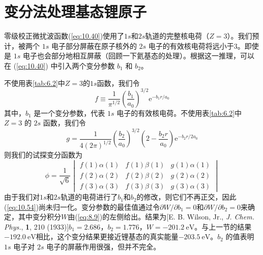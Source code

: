 \section{变分法处理基态锂原子}
\label{sec:10.8 Variation Treatments of the Lithium Ground State}

    零级校正微扰波函数(\ref{eq:10.40})使用了$1s$和$2s$轨道的完整核电荷（$Z=3$）。我们预计，被两个 $1s$ 电子部分屏蔽在原子核外的 $2s$ 电子的有效核电荷将远小于3。即使是 $1s$ 电子也会部分地相互屏蔽（回顾一下氦基态的处理）。根据这一推理，可以在 (\ref{eq:10.40}) 中引入两个变分参数 $b_1$ 和 $b_2$。

    不使用表\ref{tab:6.2}中$Z=3$的$1s$函数，我们令
    \begin{equation}
        f \equiv \frac{1}{\pi^{1/2}}\left(\frac{b_1}{a_0}\right)^{3/2} \mathrm{e}^{-b_1r/a_0}
        \label{eq:10.52}
    \end{equation}
    其中，$b_1$ 是一个变分参数，代表 $1s$ 电子的有效核电荷。不使用表\ref{tab:6.2}中 $Z=3$ 的 $2s$ 函数，我们令
    \begin{equation}
        g = \frac{1}{4\left(2\pi\right)^{1/2}} \left( \frac{b_2}{a_0} \right)^{3/2} \left( 2 - \frac{b_2 r}{a_0} \right) \mathrm{e}^{-b_2 r/2a_0}
        \label{eq:10.53}
    \end{equation}
    则我们的试探变分函数为
    \begin{equation}
        \phi = \frac{1}{\sqrt{6}} \begin{vmatrix}
            f\left(1\right)\alpha\left(1\right) & f\left(1\right)\beta\left(1\right) & g\left(1\right)\alpha\left(1\right) \\
            f\left(2\right)\alpha\left(2\right) & f\left(2\right)\beta\left(2\right) & g\left(2\right)\alpha\left(2\right) \\
            f\left(3\right)\alpha\left(3\right) & f\left(3\right)\beta\left(3\right) & g\left(3\right)\alpha\left(3\right)
        \end{vmatrix}
        \label{eq:10.54}
    \end{equation}
    由于我们对$1s$和$2s$轨道的电荷进行了$b_1$和$b_2$的修改，则它们不再正交，因此(\ref{eq:10.54})尚未归一化。变分参数的最佳值通过令$\partial W / \partial b_1 = 0$和$\partial W / \partial b_2 = 0$来确定，其中变分积分$W$由(\ref{eq:8.9})的左侧给出。结果为[E. B. Wilson, Jr., \textit{J. Chem. Phys.}, \textbf{1}, 210 (1933)]$b_1 = 2.686$，$b_2 = 1.776$，$W = -201.2 \: \mathrm{eV}$。与上一节的结果$-192.0 \: \mathrm{eV}$相比，这个变分结果更接近锂基态的真实能量$-203.5 \: \mathrm{eV}$。$b_2$ 的值表明 $1s$ 电子对 $2s$ 电子的屏蔽作用很强，但并不完全。

